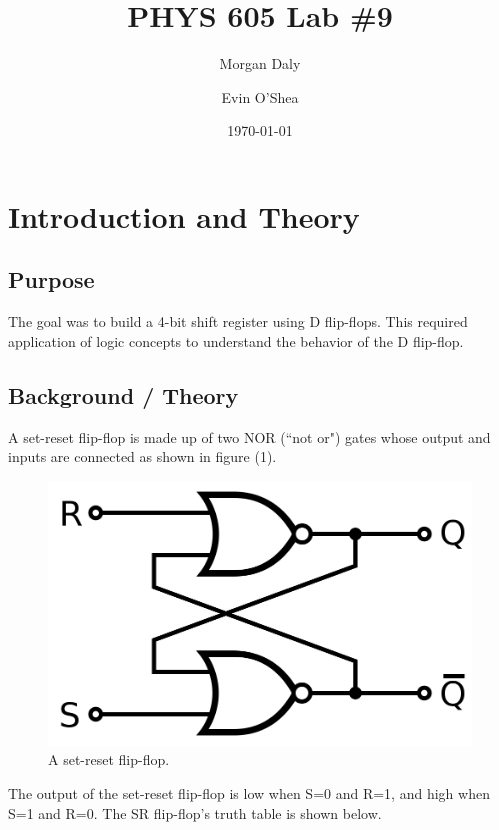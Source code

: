\documentclass[twocolumn, amsmath]{revtex4}
\begin{document}
\title{PHYS 605 Lab \#9} 

\author{Morgan Daly}
\author{Evin O'Shea}
\date{\today} 


\maketitle


\section{Introduction and Theory}
\subsection{Purpose}

The goal was to build a 4-bit shift register using D flip-flops. This required application of logic concepts to understand the behavior of the D flip-flop.


\subsection{Background / Theory}

A set-reset flip-flop is made up of two NOR (``not or") gates whose output and inputs are connected as shown in figure (1).

\begin{figure}[h]
    \includegraphics[scale=0.18]{setreset}  
    \caption{A set-reset flip-flop.}
\end{figure}

The output of the set-reset flip-flop is low when S=0 and R=1, and high when S=1 and R=0. The SR flip-flop's truth table is shown below.
\end{document}
